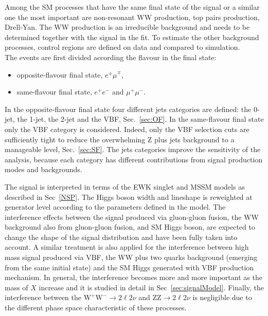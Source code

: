 Among the SM processes that have the same final state of the signal or a similar one the most important are non-resonant WW production, top pairs production, Drell-Yan. The WW production is an irreducible background and needs to be determined together with the signal in the fit. To estimate the other background processes, control regions are defined on data and compared to simulation. \\
The events are first divided according the flavour in the final state: 
\begin{itemize}
\item opposite-flavour final state, $e^{\pm} \mu^{\mp}$,
\item same-flavour final state, $e^+ e^-$ and  $\mu^+ \mu^-$. 
\end{itemize}
In the opposite-flavour final state four different jets categories are defined: the 0-jet, the 1-jet, the 2-jet and the VBF, Sec.~\ref{sec:OF}. 
In the same-flavour final state only the VBF category is considered. Indeed, only the VBF selection cuts are sufficiently tight to reduce the  overwhelming Z plus jets background to a manageable level, Sec.~\ref{sec:SF}. The jets categories improve the sensitivity of the analysis, because each category has different contributions from signal production modes and backgrounds.

The signal is interpreted in terms of the EWK singlet and MSSM models as described in Sec~\ref{NSP}. The Higgs boson width and lineshape is reweighted at generator level according to the parameters defined in the model. The interference effects between the signal produced via gluon-gluon fusion, the WW background also from gluon-gluon fusion, and SM Higgs boson, are expected to change the shape of the signal distribution and have been fully taken into account. 
A similar treatment is also applied for the interference between high mass signal produced via VBF, the WW plus two quarks background (emerging from the same initial state) and the SM Higgs generated with VBF production mechanism. In general, the interference becomes more and more important as the mass of $X$ increase and it is studied in detail in Sec~\ref{sec:signalModel}.
Finally, the interference between the $\mathrm{W^+W^-}\to2\ell2\nu$ and $\mathrm{ZZ}\to2\ell2\nu$ is negligible due to the different phase space characteristic of these processes.




